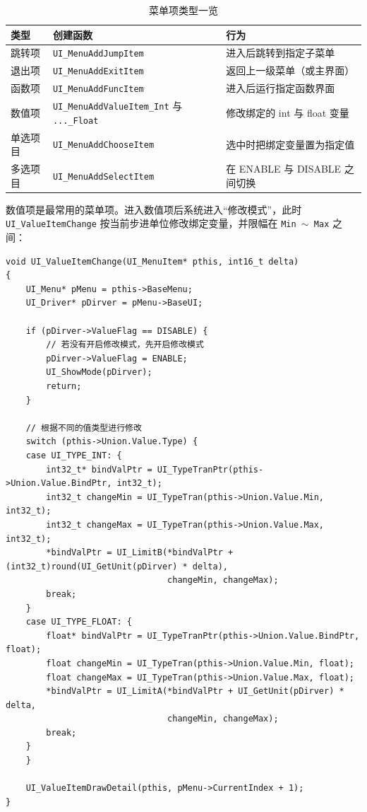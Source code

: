 \begin{table}[htbp]
\centering \caption{菜单项类型一览} \label{tab:menu-item}
    \begin{tabular}{lll}
        \toprule
        类型 & 创建函数 & 行为 \\
        \midrule
        跳转项 & \texttt{UI\_MenuAddJumpItem}  & 进入后跳转到指定子菜单 \\
        退出项 & \texttt{UI\_MenuAddExitItem}  & 返回上一级菜单（或主界面） \\
        函数项 & \texttt{UI\_MenuAddFuncItem}  & 进入后运行指定函数界面 \\
        数值项 & \texttt{UI\_MenuAddValueItem\_Int} 与 \texttt{...\_Float} & 修改绑定的 int 与 float 变量 \\
        单选项目 & \texttt{UI\_MenuAddChooseItem} & 选中时把绑定变量置为指定值 \\
        多选项目 & \texttt{UI\_MenuAddSelectItem} & 在 ENABLE 与 DISABLE 之间切换 \\
        \bottomrule
    \end{tabular}
\end{table}

数值项是最常用的菜单项。进入数值项后系统进入“修改模式”，此时 \texttt{UI\_ValueItemChange} 按当前步进单位修改绑定变量，并限幅在 \texttt{Min~$\sim$~Max} 之间：

\begin{lstlisting}[style=c]
void UI_ValueItemChange(UI_MenuItem* pthis, int16_t delta)
{
    UI_Menu* pMenu = pthis->BaseMenu;
    UI_Driver* pDirver = pMenu->BaseUI;

    if (pDirver->ValueFlag == DISABLE) {
        // 若没有开启修改模式，先开启修改模式
        pDirver->ValueFlag = ENABLE;
        UI_ShowMode(pDirver);
        return;
    }

    // 根据不同的值类型进行修改
    switch (pthis->Union.Value.Type) {
    case UI_TYPE_INT: {
        int32_t* bindValPtr = UI_TypeTranPtr(pthis->Union.Value.BindPtr, int32_t);
        int32_t changeMin = UI_TypeTran(pthis->Union.Value.Min, int32_t);
        int32_t changeMax = UI_TypeTran(pthis->Union.Value.Max, int32_t);
        *bindValPtr = UI_LimitB(*bindValPtr + (int32_t)round(UI_GetUnit(pDirver) * delta),
                                changeMin, changeMax);
        break;
    }
    case UI_TYPE_FLOAT: {
        float* bindValPtr = UI_TypeTranPtr(pthis->Union.Value.BindPtr, float);
        float changeMin = UI_TypeTran(pthis->Union.Value.Min, float);
        float changeMax = UI_TypeTran(pthis->Union.Value.Max, float);
        *bindValPtr = UI_LimitA(*bindValPtr + UI_GetUnit(pDirver) * delta,
                                changeMin, changeMax);
        break;
    }
    }

    UI_ValueItemDrawDetail(pthis, pMenu->CurrentIndex + 1);
}
\end{lstlisting}


